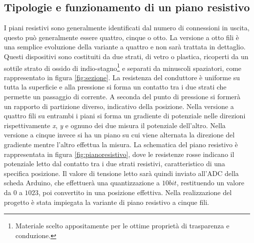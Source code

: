 \documentclass[12pt,twoside,openright]{report}
\begin{document}
\subsection{Tipologie e funzionamento di un piano resistivo}\label{tipofunz}
I piani resistivi sono generalmente identificati dal numero di connessioni in uscita, questo può generalmente essere quattro, cinque o otto. La versione a otto fili è una semplice evoluzione della variante a quattro e non sarà trattata in dettaglio. Questi dispositivi sono costituiti da due strati, di vetro o plastica, ricoperti da un sottile strato di ossido di indio-stagno\footnote{Materiale scelto appositamente per le ottime proprietà di trasparenza e conduzione.} e separati da minuscoli spaziatori, come rappresentato in figura \ref{fig:sezione}. 
La resistenza del conduttore è uniforme su tutta la superficie e alla pressione si forma un contatto tra i due strati che permette un passaggio di corrente. A seconda del punto di pressione si formerà un rapporto di partizione diverso, indicativo della posizione.
Nella versione a quattro fili su entrambi i piani si forma un gradiente di potenziale nelle direzioni rispettivamente \emph{x}, \emph{y} e ognuno dei due misura il potenziale dell'altro. Nella versione a cinque invece si ha un piano su cui viene alternata la direzione del gradiente mentre l'altro effettua la misura\cite{pianoresistivo}. La schematica del piano resistivo è rappresentata in figura \ref{fig:pianoresistivo}, dove le resistenze rosse indicano il potenziale letto dal contatto tra i due strati resistivi, caratteristico di una specifica posizione. Il valore di tensione letto sarà quindi inviato all'ADC della scheda Arduino, che effettuerà una quantizzazione a $10bit$, restituendo un valore da $0$ a $1023$, poi convertito in una posizione effettiva.
Nella realizzazione del progetto è stata impiegata la variante di piano resistivo a cinque fili.
\end{document}
